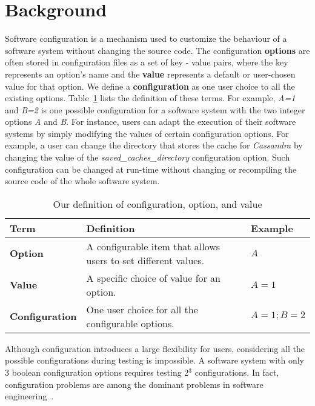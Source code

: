 
\section{Background}
\label{sec:back}



Software configuration is a mechanism used to customize the behaviour of a software system without changing the source code. The configuration \textbf{options} are often stored in configuration files as a set of key - value pairs, where the key represents an option's name and the \textbf{value} represents a default or user-chosen value for that option. We define a \textbf{configuration} as one user choice to all the existing options. Table~\ref{tab:terms} lists the definition of these terms. For example, \emph{A=1} and \emph{B=2} is one possible configuration for a software system with the two integer options \emph{A} and \emph{B}. For instance, users can adapt the execution of their software systems by simply modifying the values of certain configuration options. For example, a user can change the directory that stores the cache for \emph{Cassandra} by changing the value of the \textit{saved\_caches\_directory} configuration option. Such configuration can be changed at run-time without changing or recompiling the source code of the whole software system.

\begin{table}[ht]
    \centering
    \caption{Our definition of configuration, option, and value}
    \begin{tabular}{l|p{6.6cm}|l}
        \hline
        Term & Definition & Example \\
        \hline
        \textbf{Option}  & A configurable item that allows users to set different values. & $A$ \\
        \textbf{Value} & A specific choice of value for an option. & $A = 1$ \\
        \textbf{Configuration} & One user choice for all the configurable options. & $A = 1; B = 2$ \\
        \hline
    \end{tabular}
    \label{tab:terms}
\end{table}


Although configuration introduces a large flexibility for users, considering all the possible configurations during testing is impossible. A software system with only 3 boolean configuration options requires testing 2${^3}$ configurations. In fact, configuration problems are among the dominant problems in software engineering~\cite{tse,RN2897}.

